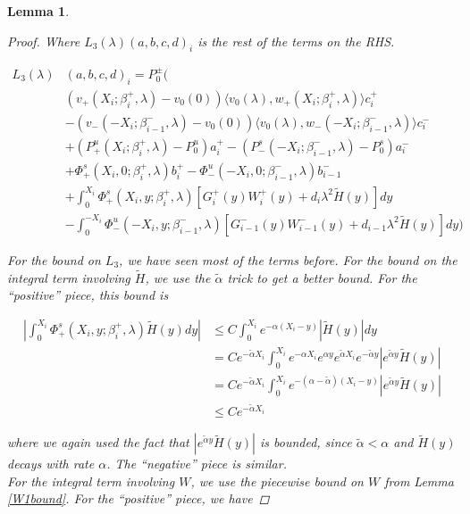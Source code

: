 \documentclass[12pt]{article}
\newtheorem{lemma}{Lemma}
\begin{document}
\begin{lemma}
\begin{proof}
Where $L_3(\lambda)(a, b, c, d)_i$ is the rest of the terms on the RHS.

\begin{align*}
L_3(\lambda)&(a, b, c, d)_i = P_0^\pm \Big( \\
&(v_+(X_i; \beta_i^+, \lambda) - v_0(0)) \langle v_0(\lambda), w_+(X_i; \beta_i^+, \lambda) \rangle c_i^+ \\
&- (v_-(-X_i; \beta_{i-1}^-, \lambda) - v_0(0)) \langle v_0(\lambda), w_-(-X_i; \beta_{i-1}^-, \lambda) \rangle c_i^- \\
&+ (P^u_+(X_i; \beta_i^+, \lambda) - P_0^u)a_i^+ - (P^s_-(-X_i; \beta_{i-1}^-, \lambda) - P_0^s)a_i^- \\
&+ \Phi^s_+(X_i, 0; \beta_i^+, \lambda)b_i^+ - \Phi^u_-(-X_i, 0; \beta_{i-1}^-, \lambda)b_{i-1}^- \\
&+ \int_0^{X_i} \Phi^s_+(X_i, y; \beta_i^+, \lambda) [ G_i^+(y) W_i^+(y) + d_i \lambda^2 \tilde{H}(y) ] dy \\
&- \int_0^{-X_i} \Phi^u_-(-X_i, y; \beta_{i-1}^-, \lambda) [ G_{i-1}^-(y) W_{i-1}^-(y) + d_{i-1} \lambda^2 \tilde{H}(y) ] dy \Big)
\end{align*}

For the bound on $L_3$, we have seen most of the terms before. For the bound on the integral term involving $\tilde{H}$, we use the $\tilde{\alpha}$ trick to get a better bound. For the ``positive'' piece, this bound is

\begin{align*}
\left| \int_0^{X_i} \Phi^s_+(X_i, y; \beta_i^+, \lambda) \tilde{H}(y) dy \right| 
&\leq C \int_0^{X_i} e^{-\alpha (X_i - y)}|\tilde{H}(y)| dy \\
&= C e^{-\tilde{\alpha}X_i} \int_0^{X_i} e^{-\alpha X_i} e^{\alpha y}  e^{\tilde{\alpha}X_i} e^{-\tilde{\alpha}y} |e^{\tilde{\alpha}y} \tilde{H}(y)| \\
&= C e^{-\tilde{\alpha}X_i} \int_0^{X_i} e^{-(\alpha - \tilde{\alpha})(X_i-y)} |e^{\tilde{\alpha}y} \tilde{H}(y)|\\
&\leq C e^{-\tilde{\alpha}X_i} 
\end{align*}

where we again used the fact that $|e^{\tilde{\alpha}y} \tilde{H}(y)|$ is bounded, since $\tilde{\alpha} < \alpha$ and $\tilde{H}(y)$ decays with rate $\alpha$. The ``negative'' piece is similar.\\

For the integral term involving $W$, we use the piecewise bound on $W$ from Lemma \ref{W1bound}. For the ``positive'' piece, we have


\end{proof}
\end{lemma}
\end{document}
